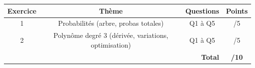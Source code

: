 \documentclass[a4paper,11pt]{article}
\begin{document}
\vfill

\begin{center}
\begin{tabular}{|c|c|c|c|}
\hline
\textbf{Exercice} & \textbf{Thème} & \textbf{Questions} & \textbf{Points} \\
\hline
1 & Probabilités (arbre, probas totales) & Q1 à Q5 & /5 \\
\hline
2 & Polynôme degré 3 (dérivée, variations, optimisation) & Q1 à Q5 & /5 \\
\hline
\multicolumn{3}{|r|}{\textbf{Total}} & \textbf{/10} \\
\hline
\end{tabular}
\end{center}
\end{document}
